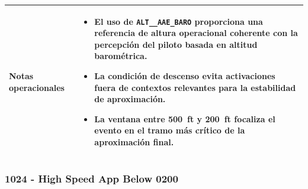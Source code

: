 \documentclass[11pt,a4paper]{article}
\begin{document}
\begin{longtable}{p{5cm} p{9.5cm}}
		\textbf{Notas operacionales} &
		\begin{itemize}
			\item El uso de \texttt{ALT\_\_AAE\_BARO} proporciona una referencia de altura operacional coherente con la percepción del piloto basada en altitud barométrica.
			\item La condición de descenso evita activaciones fuera de contextos relevantes para la estabilidad de aproximación.
			\item La ventana entre \SI{500}{ft} y \SI{200}{ft} focaliza el evento en el tramo más crítico de la aproximación final.
		\end{itemize} \\
		\hline
		
	\end{longtable}
	
	\subsubsection{1024 - High Speed App Below 0200}
	
\end{document}
